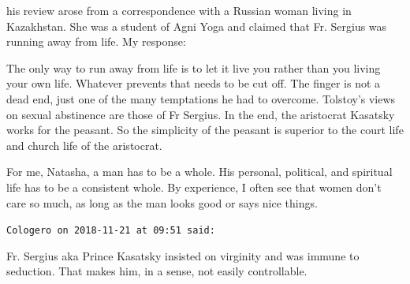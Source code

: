 \begin{footnotesize}
\begin{sffamily}
his review arose from a correspondence with a Russian woman living in Kazakhstan. She was a student of Agni Yoga and claimed that Fr. Sergius was running away from life. My response:

The only way to run away from life is to let it live you rather than you living your own life. Whatever prevents that needs to be cut off. The finger is not a dead end, just one of the many temptations he had to overcome. Tolstoy's views on sexual abstinence are those of Fr Sergius. In the end, the aristocrat Kasatsky works for the peasant. So the simplicity of the peasant is superior to the court life and church life of the aristocrat.

For me, Natasha, a man has to be a whole. His personal, political, and spiritual life has to be a consistent whole. By experience, I often see that women don't care so much, as long as the man looks good or says nice things.

\hfill

\texttt{Cologero on 2018-11-21 at 09:51 said:}

Fr. Sergius aka Prince Kasatsky insisted on virginity and was immune to seduction. That makes him, in a sense, not easily controllable.

\end{sffamily}
\end{footnotesize}

